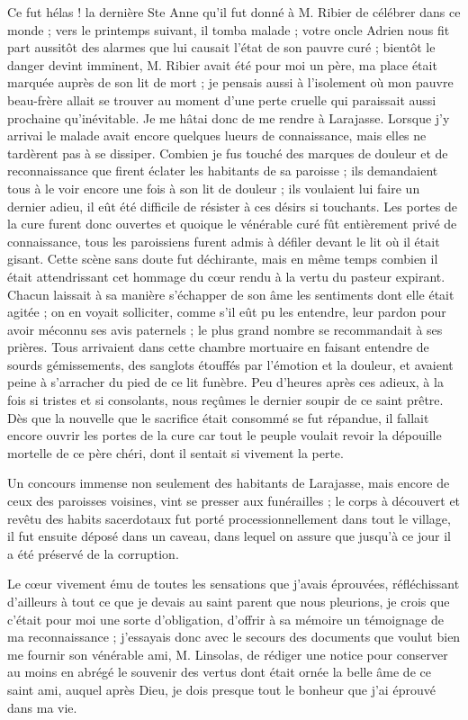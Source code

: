 \documentclass[11pt,a4paper]{report}
\begin{document}
Ce fut hélas ! la dernière Ste Anne qu'il fut donné à M. Ribier de célébrer dans ce monde ; vers le printemps suivant, il tomba malade ; votre oncle Adrien nous fit part aussitôt des alarmes que lui causait l'état de son pauvre curé ; bientôt le danger devint imminent, M. Ribier avait été pour moi un père, ma place était marquée auprès de son lit de mort ; je pensais aussi à l'isolement où mon pauvre beau-frère allait se trouver au moment d'une perte cruelle qui paraissait aussi prochaine qu'inévitable. Je me hâtai donc de me rendre à Larajasse. Lorsque j'y arrivai le malade avait encore quelques lueurs de connaissance, mais elles ne tardèrent pas à se dissiper. Combien je fus touché des marques de douleur et de reconnaissance que firent éclater les habitants de sa paroisse ; ils demandaient tous à le voir encore une fois à son lit de douleur ; ils voulaient lui faire un dernier adieu, il eût été difficile de résister à ces désirs si touchants. Les portes de la cure furent donc ouvertes et quoique le vénérable curé fût entièrement privé de connaissance, tous les paroissiens furent admis à défiler devant le lit où il était gisant. Cette scène sans doute fut déchirante, mais en même temps combien il était attendrissant cet hommage du cœur rendu à la vertu du pasteur expirant. Chacun laissait à sa manière s'échapper de son âme les sentiments dont elle était agitée ; on en voyait solliciter, comme s'il eût pu les entendre, leur pardon pour avoir méconnu ses avis paternels ; le plus grand nombre se recommandait à ses prières. Tous arrivaient dans cette chambre mortuaire en faisant entendre de sourds gémissements, des sanglots étouffés par l'émotion et la douleur, et avaient peine à s'arracher du pied de ce lit funèbre. Peu d'heures après ces adieux, à la fois si tristes et si consolants, nous reçûmes le dernier soupir de ce saint prêtre. Dès que la nouvelle que le sacrifice était consommé se fut répandue, il fallait encore ouvrir les portes de la cure car tout le peuple voulait revoir la dépouille mortelle de ce père chéri, dont il sentait si vivement la perte.

Un concours immense non seulement des habitants de Larajasse, mais encore de ceux des paroisses voisines, vint se presser aux funérailles ; le corps à découvert et revêtu des habits sacerdotaux fut porté processionnellement dans tout le village, il fut ensuite déposé dans un caveau, dans lequel on assure que jusqu'à ce jour il a été préservé de la corruption.

Le cœur vivement ému de toutes les sensations que j'avais éprouvées, réfléchissant d'ailleurs à tout ce que je devais au saint parent que nous pleurions, je crois que c'était pour moi une sorte d'obligation, d'offrir à sa mémoire un témoignage de ma reconnaissance ; j'essayais donc avec le secours des documents que voulut bien me fournir son vénérable ami, M. Linsolas, de rédiger une notice pour conserver au moins en abrégé le souvenir des vertus dont était ornée la belle âme de ce saint ami, auquel après Dieu, je dois presque tout le bonheur que j'ai éprouvé dans ma vie.
\end{document}
